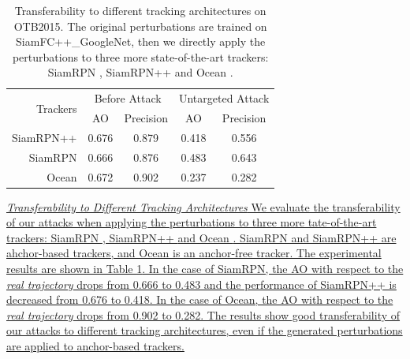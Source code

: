 \documentclass[journal]{IEEEtran}
\begin{document}
\begin{table}[t]
  \centering
  \caption{Transferability to different tracking architectures on OTB2015. The original perturbations are trained on SiamFC++\_GoogleNet, then we directly apply the perturbations to three more state-of-the-art trackers: SiamRPN \cite{SiamRPN}, SiamRPN++ \cite{SiamRPN++} and Ocean \cite{zhang2020ocean}.}
  \begin{tabular}{rcccc} 
  \toprule
  \multirow{2}{*}[-2pt]{Trackers} & \multicolumn{2}{c}{Before Attack} & \multicolumn{2}{c}{Untargeted Attack}  \\
  \cmidrule{2-5}
                            & AO & Precision              & AO & Precision                   \\
  \midrule
  SiamRPN++                 & 0.676   & 0.879                  & 0.418   & 0.556                       \\
  SiamRPN                   & 0.666   & 0.876                  & 0.483   & 0.643                       \\
  Ocean                     & 0.672   & 0.902             & 0.237 & 0.282     \\ \bottomrule
  \end{tabular}
  \label{tab:arch}
\end{table}
\uline{\textit{Transferability to Different Tracking Architectures} We evaluate the transferability of our attacks when applying the perturbations to three more tate-of-the-art trackers: SiamRPN \cite{SiamRPN}, SiamRPN++ \cite{SiamRPN++} and Ocean \cite{zhang2020ocean}. SiamRPN and SiamRPN++ are ahchor-based trackers, and Ocean is an anchor-free tracker.
The experimental results are shown in Table \ref{tab:arch}. In the case of SiamRPN, the AO with respect to the \textit{real trajectory} drops from 0.666 to 0.483 and the performance of SiamRPN++ is decreased from 0.676 to 0.418.
In the case of Ocean, the AO with respect to the \textit{real trajectory} drops from 0.902 to 0.282.
The results show good transferability of our attacks to different tracking architectures, even if the generated perturbations are applied to anchor-based trackers.
}
\end{document}
